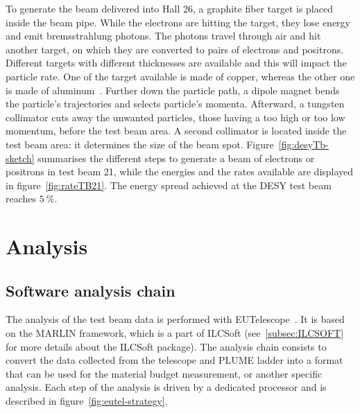     To generate the beam delivered into Hall 26, a graphite fiber target is placed inside the beam pipe.
    While the electrons are hitting the target, they lose energy and emit bremsstrahlung photons.
    The photons travel through air and hit another target, on which they are converted to pairs of electrons and positrons.
    Different targets with different thicknesses are available and this will impact the particle rate.
    One of the target available is made of copper, whereas the other one is made of aluminum~\cite{ConversionTargets}.
    Further down the particle path, a dipole magnet bends the particle's trajectories and selects particle's momenta.
    Afterward, a tungsten collimator cuts away the unwanted particles, those having a too high or too low momentum, before the test beam area.
    A second collimator is located inside the test beam area: it determines the size of the beam spot.
    Figure~\ref{fig:desyTb-sketch} summarises the different steps to generate a beam of electrons or positrons in test beam 21, while the energies and the rates available are displayed in figure~\ref{fig:rateTB21}.
    The energy spread achieved at the \gls{DESY} test beam reaches $5~\%$.
  
  \section{Analysis}
  \label{sec:X0}

   \subsection{Software analysis chain}

    The analysis of the test beam data is performed with EUTelescope~\cite{Eutel}\cite{Jansen}.
    It is based on the MARLIN framework, which is a part of ILCSoft (see~\ref{subsec:ILCSOFT} for more details about the ILCSoft package).
    The analysis chain consists to convert the data collected from the telescope and \gls{PLUME} ladder into a format that can be used for the material budget measurement, or another specific analysis.
    Each step of the analysis is driven by a dedicated processor and is described in figure~\ref{fig:eutel-strategy}.
    
